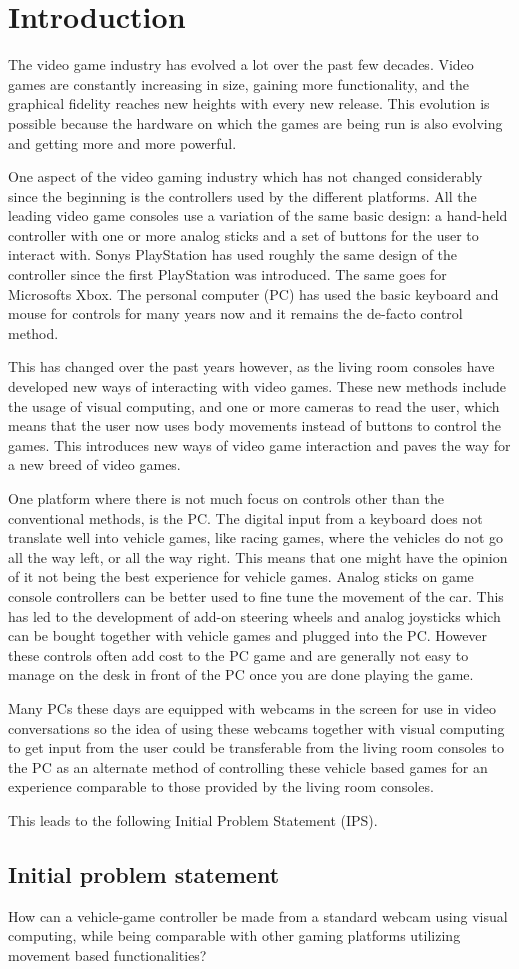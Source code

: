 \section{Introduction}
The video game industry has evolved a lot over the past few decades. Video games are constantly increasing in size, gaining more functionality, and the graphical fidelity reaches new heights with every new release. This evolution is possible because the hardware on which the games are being run is also evolving and getting more and more powerful.
\bigskip

One aspect of the video gaming industry which has not changed considerably since the beginning is the controllers used by the different platforms. All the leading video game consoles use a variation of the same basic design: a hand-held controller with one or more analog sticks and a set of buttons for the user to interact with. Sonys PlayStation has used roughly the same design of the controller since the first PlayStation was introduced. The same goes for Microsofts Xbox. The personal computer (PC) has used the basic keyboard and mouse for controls for many years now and it remains the de-facto control method.
\bigskip

This has changed over the past years however, as the living room consoles have developed new ways of interacting with video games. These new methods include the usage of visual computing, and one or more cameras to read the user, which means that the user now uses body movements instead of buttons to control the games. This introduces new ways of video game interaction and paves the way for a new breed of video games.
\bigskip

One platform where there is not much focus on controls other than the conventional methods, is the PC. The digital input from a keyboard does not translate well into vehicle games, like racing games, where the vehicles do not go all the way left, or all the way right. This means that one might have the opinion of it not being the best experience for vehicle games. Analog sticks on game console controllers can be better used to fine tune the movement of the car. This has led to the development of add-on steering wheels and analog joysticks which can be bought together with vehicle games and plugged into the PC. However these controls often add cost to the PC game and are generally not easy to manage on the desk in front of the PC once you are done playing the game.
\bigskip

Many PCs these days are equipped with webcams in the screen for use in video conversations so the idea of using these webcams together with visual computing to get input from the user could be transferable from the living room consoles to the PC as an alternate method of controlling these vehicle based games for an experience comparable to those provided by the living room consoles.

\noindent This leads to the following Initial Problem Statement (IPS).

\subsection{Initial problem statement}
How can a vehicle-game controller be made from a standard webcam using visual computing, while being comparable with other gaming platforms utilizing movement based functionalities?